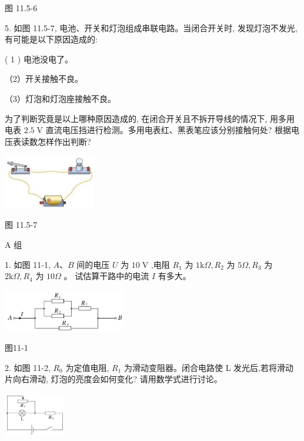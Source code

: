 \documentclass[10pt]{article}
\begin{document}
图 11.5-6

5. 如图 11.5-7, 电池、开关和灯泡组成串联电路。当闭合开关时, 发现灯泡不发光, 有可能是以下原因造成的:

( 1 ) 电池没电了。

（2）开关接触不良。

（3）灯泡和灯泡座接触不良。

为了判断究竟是以上哪种原因造成的, 在闭合开关且不拆开导线的情况下, 用多用电表 \({2.5}\mathrm{\;V}\) 直流电压挡进行检测。多用电表红、黑表笔应该分别接触何处? 根据电压表读数怎样作出判断?

\begin{center}
\includegraphics[max width=0.3\textwidth]{images/01911d5f-8e38-70c0-b5b8-2b399bd115b6_79_202617.jpg}
\end{center}

图 11.5-7

A 组

1. 如图 11-1, \(A\text{、}B\) 间的电压 \(U\) 为 \({10}\mathrm{\;V}\) ,电阻 \({R}_{1}\) 为 \(1\mathrm{k}\Omega ,{R}_{2}\) 为 \({5\Omega },{R}_{3}\) 为 \(2\mathrm{k}\Omega ,{R}_{4}\) 为 \({10\Omega }\) 。 试估算干路中的电流 \(I\) 有多大。

\begin{center}
\includegraphics[max width=0.4\textwidth]{images/01911d5f-8e38-70c0-b5b8-2b399bd115b6_80_200574.jpg}
\end{center}

图11-1

2. 如图 11-2, \({R}_{0}\) 为定值电阻, \({R}_{1}\) 为滑动变阻器。闭合电路使 \(\mathrm{L}\) 发光后,若将滑动片向右滑动, 灯泡的亮度会如何变化? 请用数学式进行讨论。

\begin{center}
\includegraphics[max width=0.2\textwidth]{images/01911d5f-8e38-70c0-b5b8-2b399bd115b6_80_776104.jpg}
\end{center}
\end{document}
